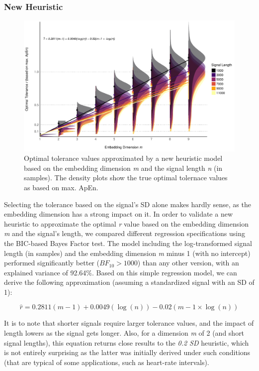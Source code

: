 \documentclass[
  man,floatsintext]{apa6}
\begin{document}
\hypertarget{new-heuristic}{%
\subsubsection{New Heuristic}\label{new-heuristic}}

\begin{figure}
\centering
\includegraphics{figures/fig2-1.pdf}
\caption{\label{fig:fig2}Optimal tolerance values approximated by a new heuristic model based on the embedding dimension \emph{m} and the signal length \emph{n} (in samples). The density plots show the true optimal tolernace values as based on max. ApEn.}
\end{figure}

Selecting the tolerance based on the signal's SD alone makes hardly sense, as the embedding dimension has a strong impact on it. In order to validate a new heuristic to approximate the optimal \emph{r} value based on the embedding dimension \emph{m} and the signal's length, we compared different regression specifications using the BIC-based Bayes Factor test. The model including the log-transformed signal length (in samples) and the embedding dimension \emph{m} minus 1 (with no intercept) performed significantly better (\(BF_{10} > 1000\)) than any other version, with an explained variance of 92.64\%. Based on this simple regression model, we can derive the following approximation (assuming a standardized signal with an SD of 1):

\begin{equation}
\widehat{r} = 0.2811(m-1) + 0.0049(\log(n)) - 0.02(m-1 \times \log(n))
\end{equation}

It is to note that shorter signals require larger tolerance values, and the impact of length lowers as the signal gets longer. Also, for a dimension \emph{m} of 2 (and short signal lengths), this equation returns close results to the \emph{0.2 SD} heuristic, which is not entirely surprising as the latter was initially derived under such conditions (that are typical of some applications, such as heart-rate intervals).
\end{document}
